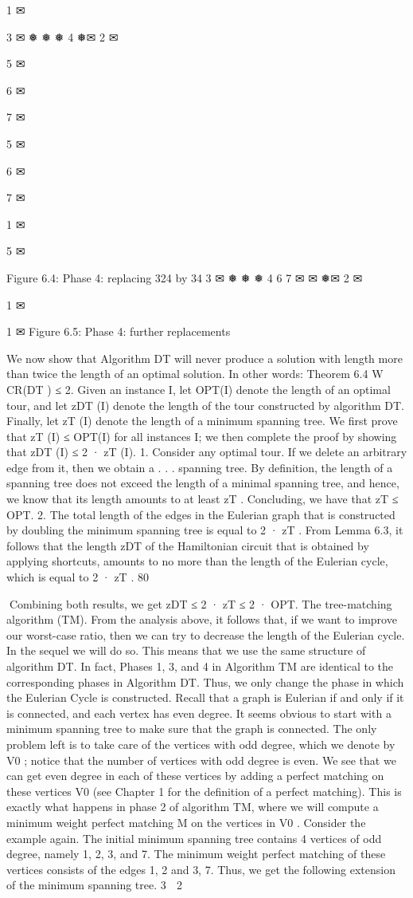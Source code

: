 1 ✉

3 ✉
❅
❅
❅ 4
❅✉
2 ✉

5
✉

6
✉

7
✉

5
✉

6
✉

7
✉

1 ✉

5
✉

Figure 6.4: Phase 4: replacing 324 by 34
3 ✉
❅
❅
❅ 4
6
7
✉
✉
❅✉
2 ✉

1 ✉

1 ✉
Figure 6.5: Phase 4: further replacements

We now show that Algorithm DT will never produce a solution with length more than twice the length
of an optimal solution. In other words:
Theorem 6.4 W CR(DT ) ≤ 2.
Given an instance I, let OPT(I) denote the length of an optimal tour, and let zDT (I) denote the length
of the tour constructed by algorithm DT. Finally, let zT (I) denote the length of a minimum spanning
tree. We first prove that zT (I) ≤ OPT(I) for all instances I; we then complete the proof by showing
that zDT (I) ≤ 2 · zT (I).
1. Consider any optimal tour. If we delete an arbitrary edge from it, then we obtain a . . . spanning tree.
By definition, the length of a spanning tree does not exceed the length of a minimal spanning tree,
and hence, we know that its length amounts to at least zT . Concluding, we have that zT ≤ OPT.
2. The total length of the edges in the Eulerian graph that is constructed by doubling the minimum
spanning tree is equal to 2 · zT . From Lemma 6.3, it follows that the length zDT of the Hamiltonian
circuit that is obtained by applying shortcuts, amounts to no more than the length of the Eulerian
cycle, which is equal to 2 · zT .
80

Combining both results, we get zDT ≤ 2 · zT ≤ 2 · OPT.
The tree-matching algorithm (TM).
From the analysis above, it follows that, if we want to improve our worst-case ratio, then we can try to
decrease the length of the Eulerian cycle. In the sequel we will do so. This means that we use the same
structure of algorithm DT. In fact, Phases 1, 3, and 4 in Algorithm TM are identical to the corresponding
phases in Algorithm DT. Thus, we only change the phase in which the Eulerian Cycle is constructed.
Recall that a graph is Eulerian if and only if it is connected, and each vertex has even degree. It seems
obvious to start with a minimum spanning tree to make sure that the graph is connected. The only
problem left is to take care of the vertices with odd degree, which we denote by V0 ; notice that the
number of vertices with odd degree is even. We see that we can get even degree in each of these vertices
by adding a perfect matching on these vertices V0 (see Chapter 1 for the definition of a perfect matching).
This is exactly what happens in phase 2 of algorithm TM, where we will compute a minimum weight
perfect matching M on the vertices in V0 .
Consider the example again. The initial minimum spanning tree contains 4 vertices of odd degree, namely
1, 2, 3, and 7. The minimum weight perfect matching of these vertices consists of the edges {1, 2} and
{3, 7}. Thus, we get the following extension of the minimum spanning tree.
3 ✉
2 ✉

